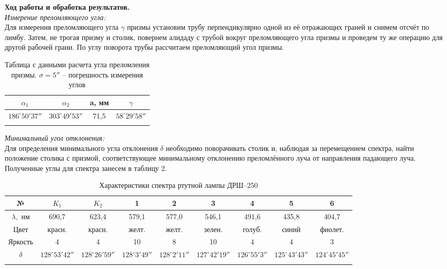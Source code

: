 \documentclass[a4paper, 12pt]{article}%
\newcommand{\RomanNumeralCaps}[1]{\uppercase\expandafter{\romannumeral#1}}
\begin{document}
	\textbf{Ход работы и обработка результатов.}\\
	
	
		
	\RomanNumeralCaps 1 \textit{Измерение преломляющего угла:}\\

	 Для измерения преломляющего угла $\gamma$ призмы установим трубу перпендикулярно одной из её отражающих граней и снимем отсчёт по лимбу. Затем, не трогая призму	и столик, повернем алидаду с трубой вокруг преломляющего угла призмы и проведем ту же операцию для другой рабочей грани. По углу поворота трубы рассчитаем преломляющий угол призмы.
	
	\begin{longtable}{|c|c|c|c|}
		\hline
		$\alpha_1$ & $\alpha_2$ & a, мм & $\gamma$ \\ \hline
		$186^\circ 50'37''$ & $303^\circ 49'53''$ & 71,5 & 	$58^\circ 29'58''$\\ \hline
		\caption{Таблица с данными расчета угла преломления призмы. $\sigma = 5''$ -- погрешность измерения углов}
	\end{longtable}

	\RomanNumeralCaps 2 \textit{Минимальный угол отклонения: } \\
	
	Для определения минимального угла отклонения $\delta$ необходимо поворачивать столик и, наблюдая за перемещением спектра, найти положение столика с призмой, соответствующее минимальному отклонению преломлённого луча от направления падающего луча.
	Полученные углы для спектра занесем в таблицу 2.
	
	\begin{longtable}{|c|c|c|c|c|c|c|c|c|}
		\hline
		№ & $K_1$ & $K_2$ & 1 & 2 & 3 & 4 & 5 & 6 \\ \hline
		$\lambda,$ нм & 690,7 & 623,4 & 579,1 & 577,0 & 546,1 & 491,6 & 435,8 & 404,7 \\ \hline
		Цвет &красн.&красн.& желт. & желт. & зелен. & голуб. & синий & фиолет. \\ \hline
		Яркость & 4 & 4&10 & 8 & 10 & 4 & 4 & 3 \\ \hline
		$\delta$ & 	$128^\circ 53'42''$ & $128^\circ 26'59''$ & $128^\circ 3'49''$ & $128^\circ 2'11''$ & $127^\circ 42'19''$ & $126^\circ 55'3''$ & $125^\circ 43'43''$ & $124^\circ 45'45''$ \\ \hline
		\caption{Характеристики спектра ртутной лампы ДРШ--250}
	\end{longtable}
	
\end{document}
